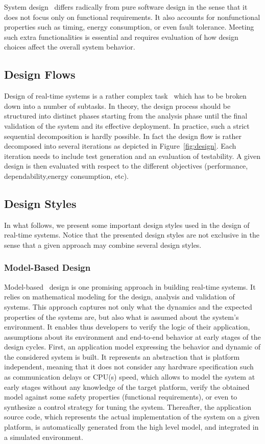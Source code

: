 System design~\cite{intro:sys_design} differs radically from pure software design in the sense
that it does not focus only on functional requirements. It also accounts for nonfunctional 
properties such as timing, energy consumption, or even fault tolerance. Meeting such 
extra functionalities is essential and requires evaluation of how design choices affect 
the overall system behavior. 

\subsection{Design Flows}
Design of real-time systems is a rather complex task~\cite{intro:sys_design2} which has to be 
broken down into a number of subtasks. In theory, the design process should be structured into
distinct phases starting from the analysis phase until the final validation of the system and 
its effective deployment. In practice, such a strict sequential decomposition 
is hardly possible.
In fact the design flow is rather decomposed into several iterations as depicted in 
Figure~\ref{fig:design}. Each iteration needs to include test generation and an evaluation 
of testability. A given design is then evaluated with respect to the different objectives 
(performance, dependability,energy consumption, etc). 


\subsection{Design Styles}

In what follows, we present some important design styles used in the design of real-time systems.
Notice that the presented design styles are not exclusive in the sense that a given approach
may combine several design styles.

\subsubsection{Model-Based Design}
Model-based~\cite{intro:mb,intro:mb2} design is one promising approach in building 
real-time systems. It relies on mathematical modeling for the design, analysis 
and validation of systems. This approach captures not only what the dynamics and the 
expected properties of the systems are, but also what is assumed about the system's environment.
It enables thus developers to verify the logic of their
application, assumptions about its environment and end-to-end behavior at early stages of the
design cycles.
First, an application model expressing the behavior and dynamic of the considered system is 
built. It represents an abstraction that is platform independent, meaning that it does not 
consider any hardware specification such as communication delays or CPU(s) speed, which allows 
to model the system at early stages without any knowledge of the target platform, 
verify the obtained model against some safety properties (functional requirements), or even
to synthesize a control strategy for tuning the system.
Thereafter, the application source code, which represents the actual 
implementation of the system on a given platform, is automatically generated from the high 
level model, and integrated in a simulated environment. 

